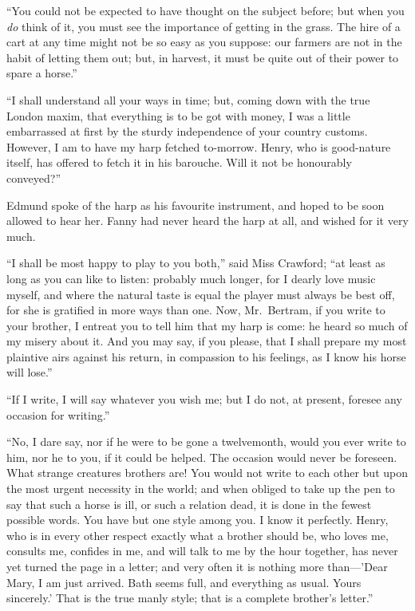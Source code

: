 \documentclass{article}
\begin{document}
``You could not be expected to have thought on the subject before;
but when you \emph{do} think of it, you must see the importance
of getting in the grass.  The hire of a cart at any time
might not be so easy as you suppose:  our farmers are
not in the habit of letting them out; but, in harvest,
it must be quite out of their power to spare a horse.''

``I shall understand all your ways in time; but, coming down
with the true London maxim, that everything is to be
got with money, I was a little embarrassed at first
by the sturdy independence of your country customs.
However, I am to have my harp fetched to-morrow. Henry,
who is good-nature itself, has offered to fetch
it in his barouche.  Will it not be honourably conveyed?''

Edmund spoke of the harp as his favourite instrument,
and hoped to be soon allowed to hear her.  Fanny had never
heard the harp at all, and wished for it very much.

``I shall be most happy to play to you both,'' said Miss
Crawford; ``at least as long as you can like to listen:
probably much longer, for I dearly love music myself,
and where the natural taste is equal the player must
always be best off, for she is gratified in more ways
than one.  Now, Mr.\ Bertram, if you write to your brother,
I entreat you to tell him that my harp is come:
he heard so much of my misery about it.  And you may say,
if you please, that I shall prepare my most plaintive
airs against his return, in compassion to his feelings,
as I know his horse will lose.''

``If I write, I will say whatever you wish me; but I do not,
at present, foresee any occasion for writing.''

``No, I dare say, nor if he were to be gone a twelvemonth,
would you ever write to him, nor he to you, if it could
be helped.  The occasion would never be foreseen.
What strange creatures brothers are!  You would not write
to each other but upon the most urgent necessity in the world;
and when obliged to take up the pen to say that such a horse
is ill, or such a relation dead, it is done in the fewest
possible words.  You have but one style among you.
I know it perfectly.  Henry, who is in every other respect
exactly what a brother should be, who loves me, consults me,
confides in me, and will talk to me by the hour together,
has never yet turned the page in a letter; and very often
it is nothing more than---'Dear Mary, I am just arrived.
Bath seems full, and everything as usual.  Yours sincerely.'
That is the true manly style; that is a complete
brother's letter.''
\end{document}
